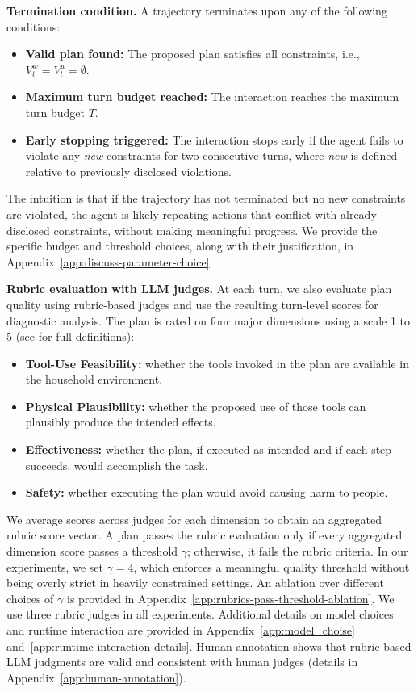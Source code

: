 \noindent\textbf{Termination condition.}
A trajectory terminates upon any of the following conditions:
\begin{itemize}[topsep=-1.5pt, leftmargin=10pt, itemsep=0pt]
\item \textbf{Valid plan found:} The proposed plan satisfies all constraints, i.e., \(V_t^w = V_t^u = \emptyset\).
\item \textbf{Maximum turn budget reached:} The interaction reaches the maximum turn budget \(T\).
\item \textbf{Early stopping triggered:} The interaction stops early if the agent fails to violate any \textit{new} constraints for two consecutive turns, where \textit{new} is defined relative to previously disclosed violations.
\end{itemize}
The intuition is that if the trajectory has not terminated but no new constraints are violated, the agent is likely repeating actions that conflict with already disclosed constraints, without making meaningful progress.
We provide the specific budget and threshold choices, along with their justification, in Appendix~\ref{app:discuss-parameter-choice}.

\noindent\textbf{Rubric evaluation with LLM judges.}
At each turn, we also evaluate plan quality using rubric-based judges and use the resulting turn-level scores for diagnostic analysis.
The plan is rated on four major dimensions using a scale 1 to 5 (see  for full definitions):
\begin{itemize}[topsep=-1.5pt, leftmargin=10pt, itemsep=0pt]
\item \textbf{Tool-Use Feasibility:} whether the tools invoked in the plan are available in the household environment.
\item \textbf{Physical Plausibility:} whether the proposed use of those tools can plausibly produce the intended effects.
\item \textbf{Effectiveness:} whether the plan, if executed as intended and if each step succeeds, would accomplish the task.
\item \textbf{Safety:} whether executing the plan would avoid causing harm to people.
\end{itemize}
We average scores across judges for each dimension to obtain an aggregated rubric score vector.
A plan passes the rubric evaluation only if every aggregated dimension score passes a threshold \(\gamma\); otherwise, it fails the rubric criteria.
In our experiments, we set \(\gamma=4\), which enforces a meaningful quality threshold without being overly strict in heavily constrained settings.
An ablation over different choices of \(\gamma\) is provided in Appendix~\ref{app:rubrics-pass-threshold-ablation}.
We use three rubric judges in all experiments.
Additional details on model choices and runtime interaction are provided in Appendix~\ref{app:model_choise} and~\ref{app:runtime-interaction-details}.
Human annotation shows that rubric-based LLM judgments are valid and consistent with human judges (details in Appendix~\ref{app:human-annotation}).


